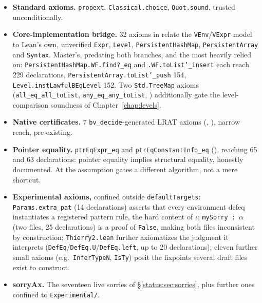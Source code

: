 \begin{itemize}
\item \textbf{Standard axioms.} \texttt{propext}, \texttt{Classical.choice}, \texttt{Quot.sound}, trusted unconditionally.
\item \textbf{Core-implementation bridge.} 32 axioms in  relate the \texttt{VEnv}/\texttt{VExpr} model to Lean's own, unverified \texttt{Expr}, \texttt{Level}, \texttt{PersistentHashMap}, \texttt{PersistentArray} and \texttt{Syntax}. Master's, predating both branches, and the most heavily relied on: \texttt{PersistentHashMap.WF.find?\_eq} and \texttt{.WF.toList'\_insert} each reach 229 declarations, \texttt{PersistentArray.toList'\_push} 154, \texttt{Level.instLawfulBEqLevel} 152. Two \texttt{Std.TreeMap} axioms (\texttt{all\_eq\_all\_toList}, \texttt{any\_eq\_any\_toList}, ) additionally gate the level-comparison soundness of Chapter~\ref{chap:levels}.
\item \textbf{Native certificates.} 7 \texttt{bv\_decide}-generated LRAT axioms (, ), narrow reach, pre-existing.
\item \textbf{Pointer equality.} \texttt{ptrEqExpr\_eq} and \texttt{ptrEqConstantInfo\_eq} (), reaching 65 and 63 declarations: pointer equality implies structural equality, honestly documented. At  the assumption gates a different algorithm, not a mere shortcut.
\item \textbf{Experimental axioms,} confined outside \texttt{defaultTargets}: \texttt{Params.extra\_pat} (14 declarations) asserts that every environment defeq instantiates a registered pattern rule, the hard content of $\iota$; \texttt{mySorry : $\alpha$} (two files, 25 declarations) is a proof of \texttt{False}, making both files inconsistent by construction; \texttt{Thierry2.lean} further axiomatizes the judgment it interprets (\texttt{DefEq}/\texttt{DefEq.U}/\texttt{DefEq.left}, up to 20 declarations); eleven further small axioms (e.g.\ \texttt{InferTypeN}, \texttt{IsTy}) posit the fixpoints several draft files exist to construct.
\item \textbf{sorryAx.} The seventeen live sorries of \S\ref{status:sec:sorries}, plus further ones confined to \texttt{Experimental/}.
\end{itemize}

